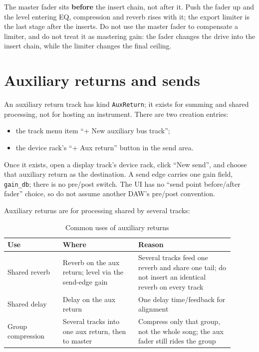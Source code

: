 The master fader sits \textbf{before} the insert chain, not after it. Push the fader up and the level entering EQ, compression and reverb rises with it; the export limiter is the last stage after the inserts. Do not use the master fader to compensate a limiter, and do not treat it as mastering gain: the fader changes the drive into the insert chain, while the limiter changes the final ceiling.

\section{Auxiliary returns and sends}

An auxiliary return track has kind \texttt{AuxReturn}; it exists for summing and shared processing, not for hosting an instrument. There are two creation entries:

\begin{itemize}
  \item the track menu item ``+ New auxiliary bus track'';
  \item the device rack's ``+ Aux return'' button in the send area.
\end{itemize}

Once it exists, open a display track's device rack, click ``New send'', and choose that auxiliary return as the destination. A send edge carries one gain field, \texttt{gain\_db}; there is no pre/post switch. The UI has no ``send point before/after fader'' choice, so do not assume another DAW's pre/post convention.


Auxiliary returns are for processing shared by several tracks:

\begin{table}[htbp]
\centering
\small
\begin{tabular}{@{}p{0.22\linewidth}p{0.30\linewidth}p{0.38\linewidth}@{}}
\hline
Use & Where & Reason \\
\hline
Shared reverb & Reverb on the aux return; level via the send-edge gain & Several tracks feed one reverb and share one tail; do not insert an identical reverb on every track \\
Shared delay & Delay on the aux return & One delay time/feedback for alignment \\
Group compression & Several tracks into one aux return, then to master & Compress only that group, not the whole song; the aux fader still rides the group \\
\hline
\end{tabular}
\caption{Common uses of auxiliary returns}
\label{tab:aux-return-uses}
\end{table}

